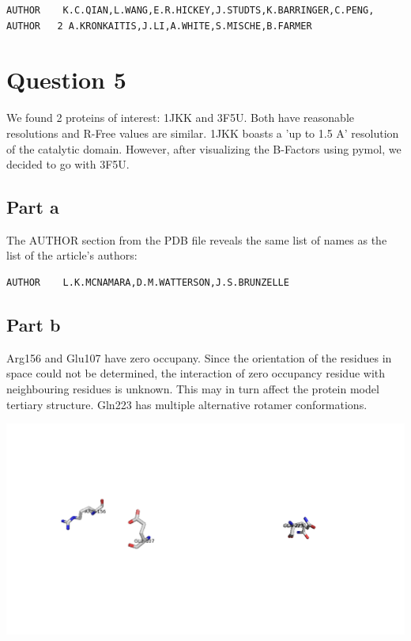 \documentclass[11pt, a4paper,titlepage]{article}
\begin{document}
\begin{verbatim}
AUTHOR    K.C.QIAN,L.WANG,E.R.HICKEY,J.STUDTS,K.BARRINGER,C.PENG,               
AUTHOR   2 A.KRONKAITIS,J.LI,A.WHITE,S.MISCHE,B.FARMER         
\end{verbatim}
 
\section{Question 5}
We found 2 proteins of interest: 1JKK and 3F5U. Both have reasonable
resolutions and R-Free values are similar. 1JKK boasts a 'up to 1.5 A'
resolution of the catalytic domain. However, after visualizing the
B-Factors using pymol, we decided to go with 3F5U.

\subsection{Part a}
The AUTHOR section from the PDB file reveals the same list of names as
the list of the article's authors:

\begin{verbatim}
AUTHOR    L.K.MCNAMARA,D.M.WATTERSON,J.S.BRUNZELLE
\end{verbatim}

\subsection{Part b}
Arg156 and Glu107 have zero occupany. Since the orientation of the
residues in space could not be determined, the interaction of zero
occupancy residue with neighbouring residues is unknown. This may in
turn affect the protein model tertiary structure.  Gln223 has multiple
alternative rotamer conformations.

\includegraphics[width=15cm]{./Figures/5b.png}
\end{document}
